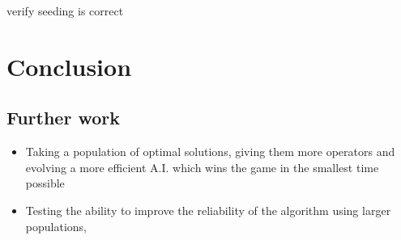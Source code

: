 \documentclass[british,10pt,a4paper]{article}
\begin{document}
\TODO verify seeding is correct
\section{Conclusion}

\subsection{Further work}
\begin{itemize}
	\item Taking a population of optimal solutions, giving them more operators and evolving a more efficient A.I. which wins the game in the smallest time possible
	\item Testing the ability to improve the reliability of the algorithm using larger populations, 
\end{itemize}

\clearpage
\end{document}
